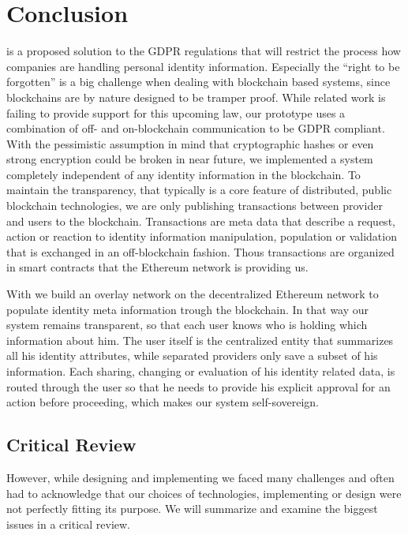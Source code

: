 \chapter{Conclusion}
\label{cha:conclusion}

\projectName{} is a proposed solution to the GDPR regulations that will restrict the process how companies are handling personal identity information. Especially the “right to be forgotten” is a big challenge when dealing with blockchain based systems, since blockchains are by nature designed to be tramper proof. While related work is failing to provide support for this upcoming law, our prototype uses a combination of off- and on-blockchain communication to be GDPR compliant. With the pessimistic assumption in mind that cryptographic hashes or even strong encryption could be broken in near future, we implemented a system completely independent of any identity information in the blockchain. To maintain the transparency, that typically is a core feature of  distributed, public blockchain technologies, we are only publishing transactions between provider and users to the blockchain. Transactions are meta data that describe a request, action or reaction to identity information manipulation, population or validation that is exchanged in an off-blockchain fashion.  Thous transactions are organized in smart contracts that the Ethereum network is providing us.

With \projectName{} we build an overlay network on the decentralized Ethereum network to populate identity meta information trough the blockchain. In that way our system remains transparent, so that each user knows who is holding which information about him. The user itself is the centralized entity that summarizes all his identity attributes, while separated providers only save a subset of his information. Each sharing, changing or evaluation of his identity related data, is routed through the user so that he needs to provide his explicit approval for an action before proceeding, which makes our system self-sovereign.

\section{Critical Review}

However, while designing and implementing \projectName{} we faced many challenges and often had to acknowledge that our choices of technologies, implementing or design were not perfectly fitting its purpose. We will summarize and examine the biggest issues in a critical review.
 
